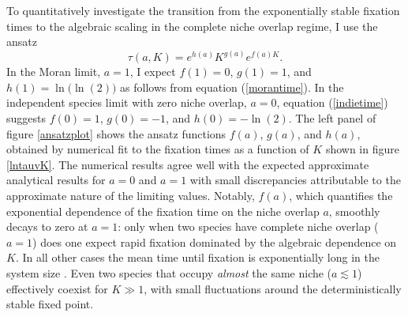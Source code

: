 To quantitatively investigate the transition from the exponentially stable fixation times to the algebraic scaling in the complete niche overlap regime, I use the ansatz
\begin{equation}
\tau(a,K) = e^{h(a)}K^{g(a)}e^{f(a)K}. \label{ansatz}
\end{equation}
In the  Moran limit, $a=1$, I expect $f(1)=0$, $g(1)=1$, and $h(1)=\ln\big(\ln(2)\big)$ as follows from equation (\ref{morantime}). In the independent species limit with zero niche overlap, $a=0$, equation (\ref{indietime}) suggests $f(0)=1$, $g(0)=-1$, and $h(0)=-\ln(2)$. 
The left panel of figure \ref{ansatzplot} shows the ansatz functions $f(a)$, $g(a)$, and $h(a)$, obtained by numerical fit to the fixation times as a function of $K$ shown in figure \ref{lntauvK}. 
The numerical results agree well with the expected approximate analytical results for $a=0$ and $a=1$ with small discrepancies attributable to the approximate nature of the limiting values. 
Notably, $f(a)$, which quantifies the exponential dependence of the fixation time on the niche overlap $a$, smoothly decays to zero at $a=1$: only when two species have complete niche overlap ($a=1$) does one expect rapid fixation dominated by the algebraic dependence on $K$. 
In all other cases the mean time until fixation is exponentially long in the system size \cite{Hanggi1990,Ovaskainen2010}. 
Even two species that occupy \emph{almost} the same niche ($a\lesssim1$) effectively coexist for $K\gg 1$, with small fluctuations around the deterministically stable fixed point. 



